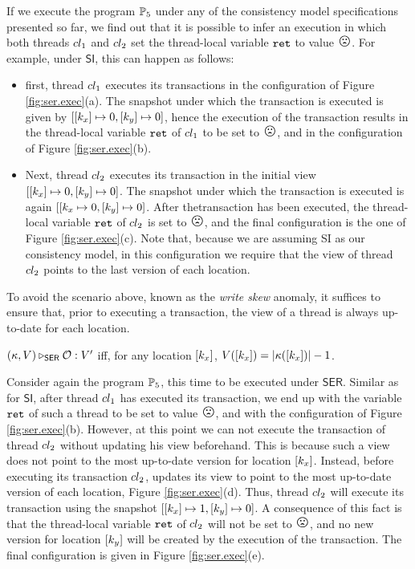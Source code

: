 If we execute the program $\mathbb{P}_5$ under any of the consistency model 
specifications presented so far, we find out that it is possible to infer 
an execution in which both threads $cl_1$ and $cl_2$ set the 
thread-local variable $\texttt{ret}$ to value ${\Large \frownie{}}$.
For example, under $\mathsf{SI}$, this can happen as follows: 
\begin{itemize}
\item first, thread $cl_1$ executes its transactions in the 
configuration of Figure \ref{fig:ser.exec}(a). The snapshot 
under which the transaction is executed is given by $[[k_x] \mapsto 0, [k_y] \mapsto 0]$, 
hence the execution of the transaction results in the thread-local variable $\texttt{ret}$ of $cl_1$ 
to be set to ${\Large \frownie{}}$, and in the configuration of Figure \ref{fig:ser.exec}(b).
\item Next, thread $cl_2$ executes its transaction in the initial 
view $[ [k_x] \mapsto 0, [k_y] \mapsto 0]$. The snapshot under which 
the transaction is executed is again $[[k_x \mapsto 0, [k_y] \mapsto 0]$. After 
thetransaction has been executed, the thread-local variable $\texttt{ret}$ of $cl_2$ is 
set to ${\Large \frownie{}}$, and the final configuration is the one of Figure \ref{fig:ser.exec}(c). 
Note that, because we are assuming SI as our consistency model, in this configuration 
we require that the view of thread $cl_2$ points to the last version of each location.
\end{itemize}

To avoid the scenario above, known as the \emph{write skew} anomaly, it suffices to 
ensure that, prior to executing a transaction, the view of a thread is always up-to-date for each location. 


\begin{definition}
$(\kappa, V) \triangleright_{\mathsf{SER}} \mathcal{O} : V'$ iff, for any location $[k_x]$, 
$V([k_x]) = \lvert \kappa([k_x]) \rvert -1$. 
\end{definition}

Consider again the program $\mathbb{P}_5$, this time to be executed under $\mathsf{SER}$. 
Similar as for $\mathsf{SI}$, after thread $cl_1$ has executed its transaction, 
we end up with the variable $\texttt{ret}$ of such a thread to be set to value ${\Large \frownie{}}$, 
and with the configuration of Figure \ref{fig:ser.exec}(b). However, at this point we can 
not execute the transaction of thread $cl_2$ without updating his view beforehand. 
This is because such a view does not point to the most up-to-date version for location 
$[k_x]$. Instead, before executing its transaction $cl_2$, updates its view to 
point to the most up-to-date version of each location, Figure \ref{fig:ser.exec}(d). 
Thus, thread $cl_2$ will execute its transaction using the snapshot $[[k_x] \mapsto 1, [k_y] \mapsto 0]$. 
A consequence of this fact is that the thread-local variable $\texttt{ret}$ of $cl_2$ will not be 
set to ${\Large \frownie{}}$, and no new version for location $[k_y]$ will be created 
by the execution of the transaction. The final configuration is given in Figure \ref{fig:ser.exec}(e).

